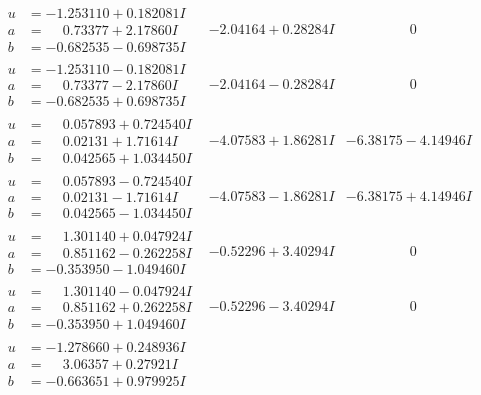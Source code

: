 \documentclass[1p]{elsarticle_modified}
\theoremstyle{definition}
\begin{document}
$$\begin{array}{c|c|c}
\begin{aligned}
u &= -1.253110 + 0.182081 I \\
a &= \phantom{-}0.73377 + 2.17860 I \\
b &= -0.682535 - 0.698735 I\end{aligned}
 & -2.04164 + 0.28284 I & \phantom{-0.000000 } 0 \\ \hline\begin{aligned}
u &= -1.253110 - 0.182081 I \\
a &= \phantom{-}0.73377 - 2.17860 I \\
b &= -0.682535 + 0.698735 I\end{aligned}
 & -2.04164 - 0.28284 I & \phantom{-0.000000 } 0 \\ \hline\begin{aligned}
u &= \phantom{-}0.057893 + 0.724540 I \\
a &= \phantom{-}0.02131 + 1.71614 I \\
b &= \phantom{-}0.042565 + 1.034450 I\end{aligned}
 & -4.07583 + 1.86281 I & -6.38175 - 4.14946 I \\ \hline\begin{aligned}
u &= \phantom{-}0.057893 - 0.724540 I \\
a &= \phantom{-}0.02131 - 1.71614 I \\
b &= \phantom{-}0.042565 - 1.034450 I\end{aligned}
 & -4.07583 - 1.86281 I & -6.38175 + 4.14946 I \\ \hline\begin{aligned}
u &= \phantom{-}1.301140 + 0.047924 I \\
a &= \phantom{-}0.851162 - 0.262258 I \\
b &= -0.353950 - 1.049460 I\end{aligned}
 & -0.52296 + 3.40294 I & \phantom{-0.000000 } 0 \\ \hline\begin{aligned}
u &= \phantom{-}1.301140 - 0.047924 I \\
a &= \phantom{-}0.851162 + 0.262258 I \\
b &= -0.353950 + 1.049460 I\end{aligned}
 & -0.52296 - 3.40294 I & \phantom{-0.000000 } 0 \\ \hline\begin{aligned}
u &= -1.278660 + 0.248936 I \\
a &= \phantom{-}3.06357 + 0.27921 I \\
b &= -0.663651 + 0.979925 I\end{aligned}

\end{array}$$
\end{document}
